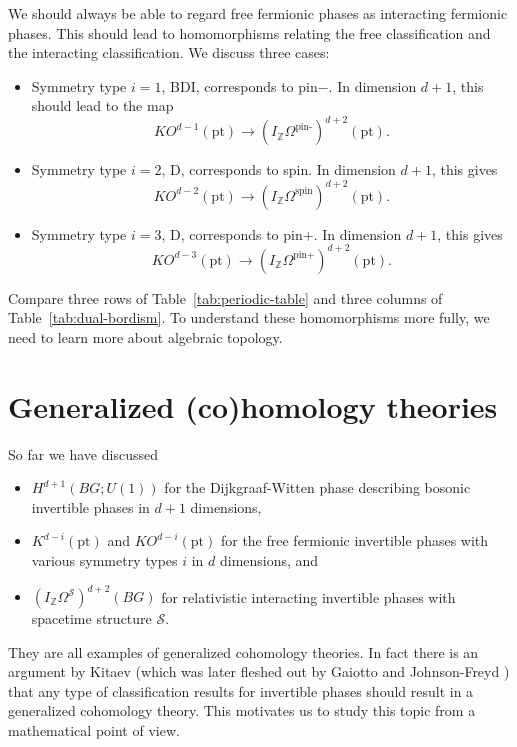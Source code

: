 \documentclass[12pt]{article}
\numberwithin{equation}{section}
\numberwithin{figure}{section}
\theoremstyle{remark}
\def\bZ{\mathbb{Z}}
\def\cS{\mathcal{S}}
\def\pt{\mathrm{pt}}
\begin{document}
We should always be able to regard free fermionic phases as interacting fermionic phases.
This should lead to homomorphisms relating the free classification and the interacting classification.
We discuss three cases:
\begin{itemize}
\item Symmetry type $i=1$, BDI, corresponds to pin$-$. In dimension $d+1$, this should lead to the map \begin{equation}
KO^{d-1}(\pt) \to (I_\bZ\Omega^\text{pin-})^{d+2}(\pt).
\end{equation}
\item Symmetry type $i=2$, D, corresponds to spin. In dimension $d+1$, this gives \begin{equation}
KO^{d-2}(\pt) \to (I_\bZ\Omega^\text{spin})^{d+2}(\pt).
\end{equation}
\item Symmetry type $i=3$, D, corresponds to pin$+$. In dimension $d+1$, this gives \begin{equation}
KO^{d-3}(\pt) \to (I_\bZ\Omega^\text{pin+})^{d+2}(\pt).
\end{equation}
\end{itemize}
Compare three rows of Table~\ref{tab:periodic-table} and three columns of Table~\ref{tab:dual-bordism}.
To understand these homomorphisms more fully, we need to learn more about algebraic topology.

\goodbreak

\section{Generalized (co)homology theories}

So far we have discussed 
\begin{itemize}
\item $H^{d+1}(BG;U(1))$ for the Dijkgraaf-Witten phase describing bosonic invertible phases in $d+1$ dimensions,
\item $K^{d-i}(\pt)$ and $KO^{d-i}(\pt)$ for the free fermionic invertible phases with various symmetry types $i$ in $d$ dimensions, and
\item $(I_\bZ\Omega^\cS)^{d+2}(BG)$ for relativistic interacting invertible phases with spacetime structure $\cS$.
\end{itemize}
They are all examples of generalized cohomology theories. 
In fact there is an argument by Kitaev \cite{KitaevCollapse} 
(which was later fleshed out by Gaiotto and Johnson-Freyd \cite{Gaiotto:2017zba}) 
that any type of classification results for invertible phases should result in a generalized cohomology theory.
This motivates us to study this topic from a mathematical point of view.
\end{document}

